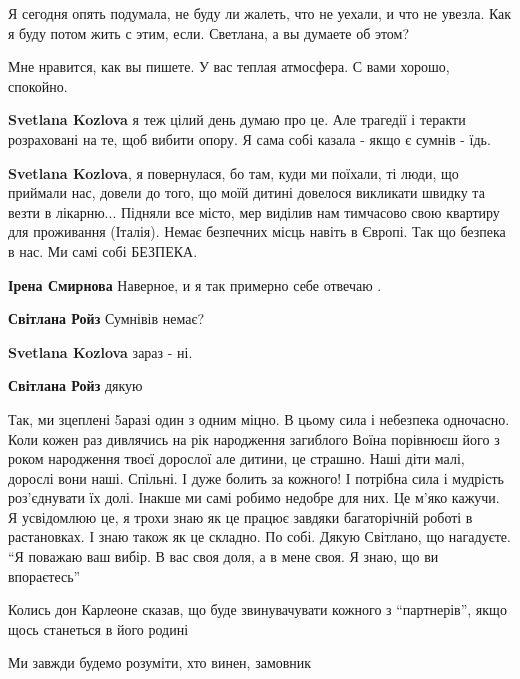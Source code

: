 \begin{itemize}

Я сегодня опять подумала, не буду ли жалеть, что не уехали, и что не увезла.
Как я буду потом жить с этим, если. Светлана, а вы думаете об этом?

\begin{itemize} %

Мне нравится, как вы пишете. У вас теплая атмосфера. С вами хорошо, спокойно.

\textbf{Svetlana Kozlova} я теж цілий день думаю про це. Але трагедії і теракти розраховані на те, щоб вибити опору. Я сама собі казала - якщо є сумнів - їдь.

\textbf{Svetlana Kozlova}, я повернулася, бо там, куди ми поїхали, ті люди, що приймали нас, довели до того, що моїй дитині довелося викликати швидку та везти в лікарню... Підняли все місто, мер виділив нам тимчасово свою квартиру для проживання (Італія). Немає безпечних місць навіть в Європі. Так що безпека в нас. Ми самі собі БЕЗПЕКА.

\textbf{Ірена Смирнова} Наверное, и я так примерно себе отвечаю .

\textbf{Світлана Ройз} Сумнівів немає?

\textbf{Svetlana Kozlova} зараз - ні.

\textbf{Світлана Ройз} дякую
\end{itemize} %


Так, ми зцеплені 5аразі один з одним міцно. В цьому сила і небезпека одночасно.
Коли кожен раз дивлячись на рік народження загиблого Воїна порівнюєш його з
роком народження твоєї дорослої але дитини, це страшно. Наші діти малі, дорослі
вони наші. Спільні. І дуже болить за кожного! І потрібна сила і мудрість
роз'єднувати їх долі. Інакше ми самі робимо недобре для них. Це м'яко кажучи. Я
усвідомлюю це, я трохи знаю як це працює завдяки багаторічній роботі в
растановках. І знаю також як це складно. По собі. Дякую Світлано, що нагадуєте.
\enquote{Я поважаю ваш вибір. В вас своя доля, а в мене своя. Я знаю, що ви впораєтесь}


Колись дон Карлеоне сказав, що буде звинувачувати кожного з \enquote{партнерів}, якщо щось станеться в його родині

Ми завжди будемо розуміти, хто винен, замовник


\end{itemize}

